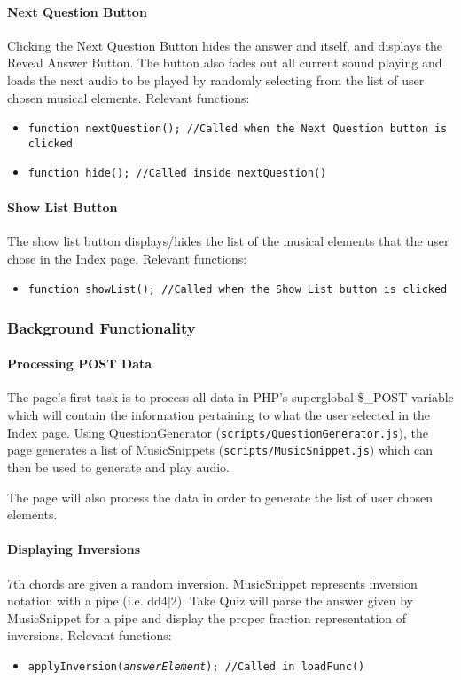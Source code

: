 \documentclass{article}
\begin{document}
\paragraph{Next Question Button}
Clicking the Next Question Button hides the answer and itself, and displays the Reveal Answer Button. The button also fades out all current sound playing and loads the next audio to be played by randomly selecting from the list of user chosen musical elements. 
\vskip 3mm
\noindent Relevant functions:
\begin{itemize}
\item \texttt{function nextQuestion(); //Called when the Next Question button is clicked}
\item \texttt{function hide(); //Called inside nextQuestion()}
\end{itemize}

\paragraph{Show List Button}
The show list button displays/hides the list of the musical elements that the user chose in the Index page.
\vskip 3mm
\noindent Relevant functions:
\begin{itemize}
\item \texttt{function showList(); //Called when the Show List button is clicked}
\end{itemize}

\subsubsection{Background Functionality}
\paragraph{Processing POST Data}
The page's first task is to process all data in PHP's superglobal \$\_POST variable which will contain the information pertaining to what the user selected in the Index page. Using QuestionGenerator (\texttt{scripts/QuestionGenerator.js}), the page generates a list of MusicSnippets (\texttt{scripts/MusicSnippet.js}) which can then be used to generate and play audio.

The page will also process the data in order to generate the list of user chosen elements.

\paragraph{Displaying Inversions}
7th chords are given a random inversion. MusicSnippet represents inversion notation with a pipe (i.e. dd4$\vert$2). Take Quiz will parse the answer given by MusicSnippet for a pipe and display the proper fraction representation of inversions.
\vskip 3mm
\noindent Relevant functions:
\begin{itemize}
\item \texttt{applyInversion(\textit{answerElement}); //Called in loadFunc()}
\end{itemize}
\end{document}

